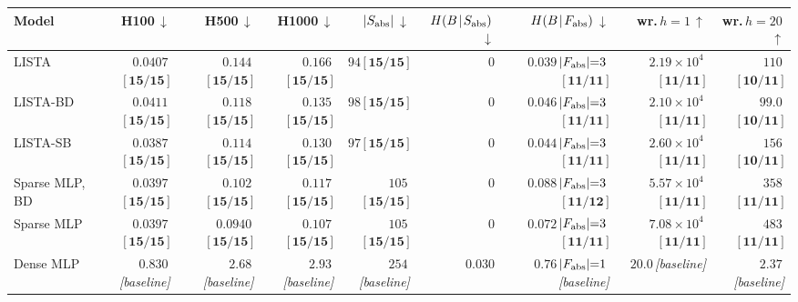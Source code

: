 \begin{tabular}{@{}l rrr r r r rr@{}}
\toprule
Model & H100\,$\downarrow$ & H500\,$\downarrow$ & H1000\,$\downarrow$ & $|S_{\rm abs}|$\,$\downarrow$ & $H(B\!\mid\!S_{\rm abs})$\,$\downarrow$ & $H(B\!\mid\!F_{\rm abs})$\,$\downarrow$ & wr.\,$h{=}1$\,$\uparrow$ & wr.\,$h{=}20$\,$\uparrow$ \\
\midrule
LISTA & $0.0407$\,$\bigl[\,\mathbf{15/15}\,\bigr]$ & $0.144$\,$\bigl[\,\mathbf{15/15}\,\bigr]$ & $0.166$\,$\bigl[\,\mathbf{15/15}\,\bigr]$ & \underline{$94$}\,$\bigl[\,\mathbf{15/15}\,\bigr]$ & $0$ & \underline{$0.039$}\,{\scriptsize $|F_{\rm abs}|{=}3$}\,$\bigl[\,\mathbf{11/11}\,\bigr]$ & $2.19{\times}10^{4}$\,$\bigl[\,\mathbf{11/11}\,\bigr]$ & $110$\,$\bigl[\,\mathbf{10/11}\,\bigr]$ \\
LISTA-BD & $0.0411$\,$\bigl[\,\mathbf{15/15}\,\bigr]$ & $0.118$\,$\bigl[\,\mathbf{15/15}\,\bigr]$ & $0.135$\,$\bigl[\,\mathbf{15/15}\,\bigr]$ & $98$\,$\bigl[\,\mathbf{15/15}\,\bigr]$ & $0$ & $0.046$\,{\scriptsize $|F_{\rm abs}|{=}3$}\,$\bigl[\,\mathbf{11/11}\,\bigr]$ & $2.10{\times}10^{4}$\,$\bigl[\,\mathbf{11/11}\,\bigr]$ & $99.0$\,$\bigl[\,\mathbf{10/11}\,\bigr]$ \\
LISTA-SB & \underline{$0.0387$}\,$\bigl[\,\mathbf{15/15}\,\bigr]$ & $0.114$\,$\bigl[\,\mathbf{15/15}\,\bigr]$ & $0.130$\,$\bigl[\,\mathbf{15/15}\,\bigr]$ & $97$\,$\bigl[\,\mathbf{15/15}\,\bigr]$ & $0$ & $0.044$\,{\scriptsize $|F_{\rm abs}|{=}3$}\,$\bigl[\,\mathbf{11/11}\,\bigr]$ & $2.60{\times}10^{4}$\,$\bigl[\,\mathbf{11/11}\,\bigr]$ & $156$\,$\bigl[\,\mathbf{10/11}\,\bigr]$ \\
Sparse MLP, BD & $0.0397$\,$\bigl[\,\mathbf{15/15}\,\bigr]$ & $0.102$\,$\bigl[\,\mathbf{15/15}\,\bigr]$ & $0.117$\,$\bigl[\,\mathbf{15/15}\,\bigr]$ & $105$\,$\bigl[\,\mathbf{15/15}\,\bigr]$ & $0$ & $0.088$\,{\scriptsize $|F_{\rm abs}|{=}3$}\,$\bigl[\,\mathbf{11/12}\,\bigr]$ & $5.57{\times}10^{4}$\,$\bigl[\,\mathbf{11/11}\,\bigr]$ & $358$\,$\bigl[\,\mathbf{11/11}\,\bigr]$ \\
Sparse MLP & $0.0397$\,$\bigl[\,\mathbf{15/15}\,\bigr]$ & \underline{$0.0940$}\,$\bigl[\,\mathbf{15/15}\,\bigr]$ & \underline{$0.107$}\,$\bigl[\,\mathbf{15/15}\,\bigr]$ & $105$\,$\bigl[\,\mathbf{15/15}\,\bigr]$ & $0$ & $0.072$\,{\scriptsize $|F_{\rm abs}|{=}3$}\,$\bigl[\,\mathbf{11/11}\,\bigr]$ & \underline{$7.08{\times}10^{4}$}\,$\bigl[\,\mathbf{11/11}\,\bigr]$ & \underline{$483$}\,$\bigl[\,\mathbf{11/11}\,\bigr]$ \\
Dense MLP & $0.830$\,\emph{[baseline]} & $2.68$\,\emph{[baseline]} & $2.93$\,\emph{[baseline]} & $254$\,\emph{[baseline]} & $0.030$ & $0.76$\,{\scriptsize $|F_{\rm abs}|{=}1$}\,\emph{[baseline]} & $20.0$\,\emph{[baseline]} & $2.37$\,\emph{[baseline]} \\
\bottomrule
\end{tabular}